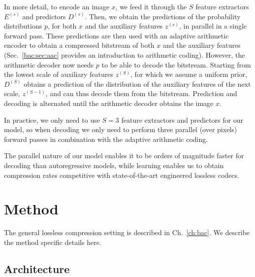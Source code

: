 In more detail, to encode an image $x$, we feed it through the $S$ feature extractors $E^{(s)}$ and predictors $D^{(s)}$. Then, we obtain the predictions of the probability distributions $p$, for both $x$ and the auxiliary features $z^{(s)}$, in parallel in a single forward pass. These predictions are then used with an adaptive arithmetic encoder to obtain a compressed bitstream of both $x$ and the auxiliary features (Sec.~\ref{bac:sec:aac} provides an introduction to arithmetic coding). However, the arithmetic decoder now needs $p$ to be able to decode the bitstream. Starting from the lowest scale of auxiliary features $z^{(S)}$, for which we assume a uniform prior, $D^{(S)}$ obtains a prediction of the distribution of the auxiliary features of the next scale, $z^{(S-1)}$, and can thus decode them from the bitstream. Prediction and decoding is alternated until the arithmetic decoder obtains the image $x$. 

In practice, we only need to use $S=3$ feature extractors and predictors for our model, so when decoding we only need to perform three parallel (over pixels) forward passes in combination with the adaptive arithmetic coding.

The parallel nature of our model enables it to be orders of magnitude faster for decoding than autoregressive models, while learning enables us to obtain compression rates competitive with state-of-the-art engineered lossless codecs.


\section{Method} \label{l3c:sec:method}

The general lossless compression setting is described in Ch.~\ref{ch:bac}. We describe the method specific details here.

\subsection{Architecture} \label{l3c:sec:arch}

